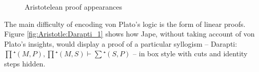 \begin{figure}
{\label{fig:Aristotle:Darapti_3}}
\caption{Aristotelean proof appearances}
\label{fig:Aristotle:Darapti_various}
\end{figure}
%
%
%
%
The main difficulty of encoding von Plato's logic is the form of linear proofs. Figure \ref{fig:Aristotle:Darapti_1} shows how Jape, without taking account of von Plato's insights, would display a proof of a particular syllogism  -- Darapti: $∏⁺(M,P), ∏⁺(M,S) ⊢ ∑⁺(S,P)$ -- in box style with cuts and identity steps hidden. 

